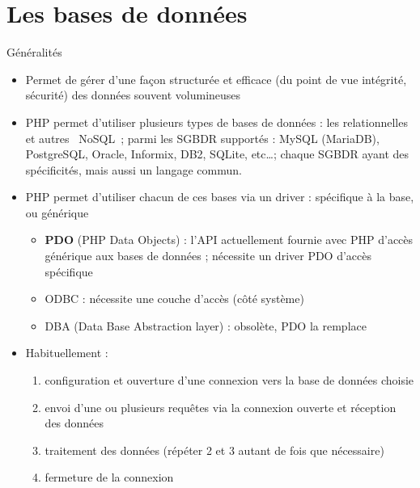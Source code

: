 
\section{Les bases de données}

\begin{frame}[containsverbatim]{Généralités}
	\begin{itemize}
		\item Permet de gérer d’une façon structurée et efficace (du point de vue intégrité, sécurité) des données souvent volumineuses
		\item PHP permet d’utiliser plusieurs types de bases de données : les relationnelles et autres \guillemotleft~NoSQL~\guillemotright ; parmi les SGBDR supportés : MySQL (MariaDB), PostgreSQL, Oracle, Informix, DB2, SQLite, etc\ldots ; chaque SGBDR ayant des spécificités, mais aussi un langage commun.
		\item PHP permet d’utiliser chacun de ces bases via un driver : spécifique à la base, ou générique 
		\begin{itemize}
			\item \textbf{PDO} (PHP Data Objects) : l’API actuellement fournie avec PHP d’accès générique aux bases de données ; nécessite un driver PDO d’accès spécifique
			\item ODBC : nécessite une couche d’accès (côté système)
			\item DBA (Data Base Abstraction layer) : obsolète, PDO la remplace
		\end{itemize}
		\item Habituellement : 
		\begin{enumerate}
			\item configuration et ouverture d’une connexion vers la base de données choisie
			\item envoi d’une ou plusieurs requêtes via la connexion ouverte et réception des données
			\item traitement des données (répéter 2 et 3 autant de fois que nécessaire)
			\item fermeture de la connexion
		\end{enumerate}
	\end{itemize}
\end{frame}
 
